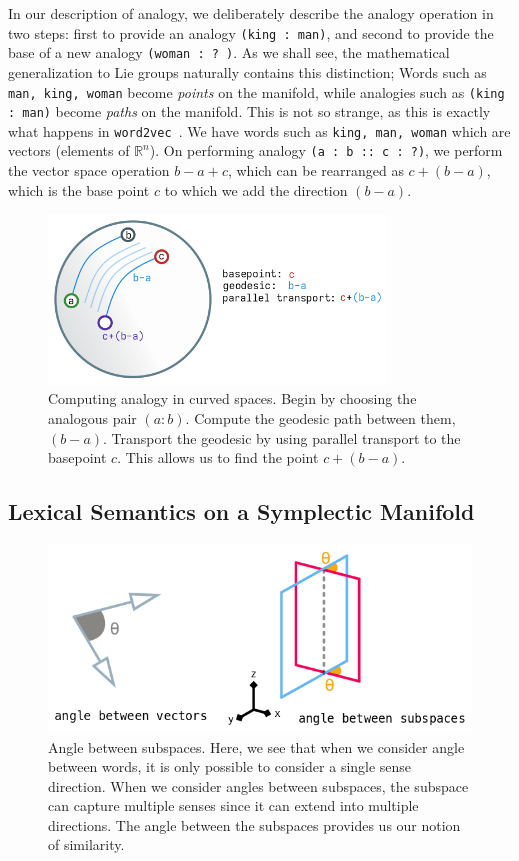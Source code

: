 \documentclass{book}
\newcommand{\wtov}{\texttt{word2vec }}
\newcommand{\R}{\ensuremath{\mathbb R}}
\begin{document}
In our description of analogy, we deliberately describe the analogy operation
in two steps: first to provide an analogy \texttt{(king : man)}, and second
to provide the base of a new analogy \texttt{(woman : ? )}. As we shall see,
the mathematical generalization to Lie groups naturally contains this distinction;
Words such as \texttt{man, king, woman} become \emph{points} on the manifold,
while analogies such as \texttt{(king : man)} become \emph{paths} on the manifold.
This is not so strange, as this is exactly what happens in \wtov. We have
words such as \texttt{king, man, woman} which are vectors (elements of $\R^n$). 
On performing analogy \texttt{(a : b :: c : ?)}, we perform the vector
space operation $b - a + c$, which can be rearranged as $c + (b - a)$, which
is the base point $c$ to which we add the direction $(b - a)$.

\begin{figure}
\includegraphics[width=0.8\textwidth]{./sphere-parallel-transport-geodesic.png}
\caption{Computing analogy in curved spaces. Begin by choosing the analogous
pair $(a : b)$. Compute the geodesic path between them, $(b - a)$. Transport
the geodesic by using parallel transport to the basepoint $c$. This allows us
to find the point $c +(b-a)$.}
\end{figure}


\subsection{Lexical Semantics on a Symplectic Manifold}

\begin{figure}[H]
\includegraphics[width=\textwidth]{./symplectic.png}
\caption{Angle between subspaces. Here, we see that when we consider angle
 between words, it is only possible to consider a single sense direction. When
 we consider angles between subspaces, the subspace can capture multiple senses
 since it can extend into multiple directions.  The angle between the subspaces
 provides us our notion of similarity.}
\end{figure}
\end{document}
